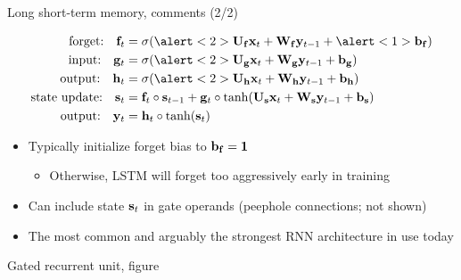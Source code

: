 \begin{frame}[t]{Long short-term memory, comments (2/2)}
    \begin{block}{}
        \vspace{-5mm}
        \begin{align*}
            \text{forget:} \quad \f_t &= \sigma(\alert<2>{\U_\f \x_t + \W_\f \y_{t-1} + \alert<1>{\b_\f}}) \\
            \text{input:} \quad \g_t &= \sigma(\alert<2>{\U_\g \x_t + \W_\g \y_{t-1} + \b_\g}) \\
            \text{output:} \quad \h_t &= \sigma(\alert<2>{\U_\h \x_t + \W_\h \y_{t-1} + \b_\h}) \\
            \text{state update:} \quad \s_t &= \f_t \circ \s_{t-1} + \g_t \circ \tanh(\U_\s \x_t + \W_\s \y_{t-1} + \b_\s) \\
            \text{output:} \quad \y_t &= \h_t \circ \tanh(\s_t)
        \end{align*}
    \end{block}

    \begin{itemize}
        \item<+-> Typically initialize forget bias to $\mathbf{b}_{\mathbf{f}} = \mathbf{1}$~\citep{GersNC00,JozefowiczICML15}
        \begin{itemize}
            \item Otherwise, LSTM will forget too aggressively early in training
        \end{itemize}
        \item<+-> Can include state $\mathbf{s}_t$ in gate operands (peephole connections; not shown)
        \item<+-> The most common and arguably the strongest RNN architecture in use today \citep{JozefowiczICML15}
    \end{itemize}
\end{frame}

\begin{frame}{Gated recurrent unit, figure}
    \centering
    
\end{frame}

